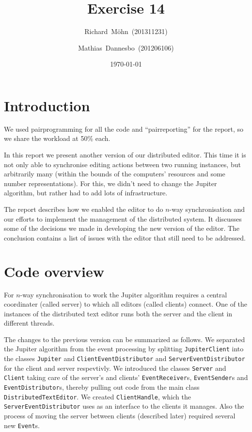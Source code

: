 \documentclass[a4paper,final,12pt,oneside,article,table]{memoir}
\newcommand{\supertitle}[1]{\gdef\suP{#1}}
\newcommand{\subtitle}[1]{\gdef\suB{#1}}
\newcommand{\stunum}[1]{\gdef\stuN{#1}}
\newcommand{\mil}[1]{\texttt{#1}}
\begin{document}
\supertitle{Distributed Systems}
\title{Exercise 14}
\author{Richard~Möhn~\small{(201311231)} \and Mathias~Dannesbo~\small{(201206106)}}
\date{\today}
\maketitle

\chapter{Introduction}
We used pairprogramming for all the code and ``pairreporting'' for the
report, so we share the workload at 50\% each.

In this report we present another version of our distributed editor.
This time it is not only able to synchronise editing actions between two
running instances, but arbitrarily many (within the bounds of the
computers' resources and some number representations). For this, we
didn't need to change the Jupiter algorithm, but rather had to add lots
of infrastructure.

The report describes how we enabled the editor to do $n$-way
synchronisation and our efforts to implement the management of the
distributed system. It discusses some of the decisions we made in
developing the new version of the editor. The conclusion contains a list
of issues with the editor that still need to be addressed.

\chapter{Code overview}
For $n$-way synchronisation to work the Jupiter algorithm requires a
central coordinater (called server) to which all editors (called
clients) connect. One of the instances of the distributed text editor
runs both the server and the client in different threads.

The changes to the previous version can be summarized as follows.  We
separated the Jupiter algorithm from the event processing by splitting
\mil{JupiterClient} into the classes \mil{Jupiter} and
\mil{ClientEventDistributor} and \mil{ServerEventDistributor} for the
client and server respevtivly. We introduced the classes \mil{Server}
and \mil{Client} taking care of the server's and clients'
\mil{EventReceiver}s, \mil{EventSender}s and \texttt{EventDistributor}s,
thereby pulling out code from the main class
\mil{DistributedTextEditor}.  We created \mil{ClientHandle}, which the
\mil{ServerEventDistributor} uses as an interface to the clients it
manages. Also the process of moving the server between clients
(described later) required several new \mil{Event}s.
\end{document}
